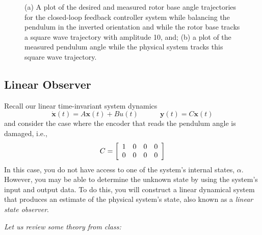 \documentclass[12pt]{report}
\begin{document}
\begin{enumerate}[Questions]
{\begin{figure}[htb!]
                  \caption{(a) A plot of the desired and measured rotor base angle trajectories for the closed-loop feedback controller system while balancing the pendulum in the inverted orientation and while the rotor base tracks a square wave trajectory with amplitude 10, and; (b) a plot of the measured pendulum angle while the physical system tracks this square wave trajectory.}
                  \label{fig:lab3_state_feedback_response}
              \end{figure}
          }
\end{enumerate}

\subsection{Linear Observer}\label{subsection:lab3_observer}
Recall our linear time-invariant system dynamics
\[\mathbf{\dot{x}}(t)=A\mathbf{x}(t)+Bu(t) \quad \quad \quad \mathbf{y}(t)=C\mathbf{x}(t)\]
and consider the case where the encoder that reads the pendulum angle is damaged, i.e.,
\[C = \left[\begin{array}{c c c c}
            1 & 0 & 0 & 0 \\
            0 & 0 & 0 & 0
        \end{array}\right]\]
In this case, you do not have access to one of the system's internal states, $\alpha$. However, you may be able to determine the unknown state by using the system's input and output data. To do this, you will construct a linear dynamical system that produces an estimate of the physical system's state, also known as a \emph{linear state observer}.

\noindent \emph{Let us review some theory from class:}
\end{document}
